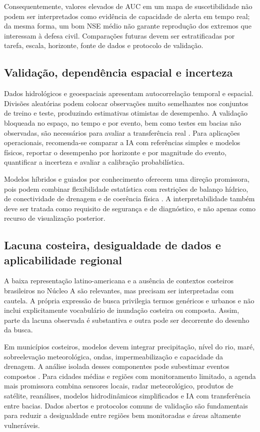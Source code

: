 Consequentemente, valores elevados de AUC em um mapa de suscetibilidade não podem ser interpretados como evidência de capacidade de alerta em tempo real; da mesma forma, um bom NSE médio não garante reprodução dos extremos que interessam à defesa civil. Comparações futuras devem ser estratificadas por tarefa, escala, horizonte, fonte de dados e protocolo de validação.

\subsection{Validação, dependência espacial e incerteza}

Dados hidrológicos e geoespaciais apresentam autocorrelação temporal e espacial. Divisões aleatórias podem colocar observações muito semelhantes nos conjuntos de treino e teste, produzindo estimativas otimistas de desempenho. A validação bloqueada no espaço, no tempo e por evento, bem como testes em bacias não observadas, são necessários para avaliar a transferência real \cite{roberts2017}. Para aplicações operacionais, recomenda-se comparar a IA com referências simples e modelos físicos, reportar o desempenho por horizonte e por magnitude do evento, quantificar a incerteza e avaliar a calibração probabilística.

Modelos híbridos e guiados por conhecimento oferecem uma direção promissora, pois podem combinar flexibilidade estatística com restrições de balanço hídrico, de conectividade de drenagem e de coerência física \cite{nearing2021}. A interpretabilidade também deve ser tratada como requisito de segurança e de diagnóstico, e não apenas como recurso de visualização posterior.

\subsection{Lacuna costeira, desigualdade de dados e aplicabilidade regional}

A baixa representação latino-americana e a ausência de contextos costeiros brasileiros no Núcleo A são relevantes, mas precisam ser interpretadas com cautela. A própria expressão de busca privilegia termos genéricos e urbanos e não inclui explicitamente vocabulário de inundação costeira ou composta. Assim, parte da lacuna observada é substantiva e outra pode ser decorrente do desenho da busca.

Em municípios costeiros, modelos devem integrar precipitação, nível do rio, maré, sobreelevação meteorológica, ondas, impermeabilização e capacidade da drenagem. A análise isolada desses componentes pode subestimar eventos compostos \cite{wahl2015}. Para cidades médias e regiões com monitoramento limitado, a agenda mais promissora combina sensores locais, radar meteorológico, produtos de satélite, reanálises, modelos hidrodinâmicos simplificados e IA com transferência entre bacias. Dados abertos e protocolos comuns de validação são fundamentais para reduzir a desigualdade entre regiões bem monitoradas e áreas altamente vulneráveis.

